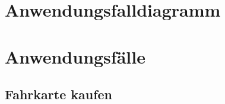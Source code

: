 \documentclass{lastenheft}
\begin{document}
\section{Anwendungsfalldiagramm}

%



\clearpage

\section{Anwendungsfälle}
\subsection{Fahrkarte kaufen}
\end{document}
